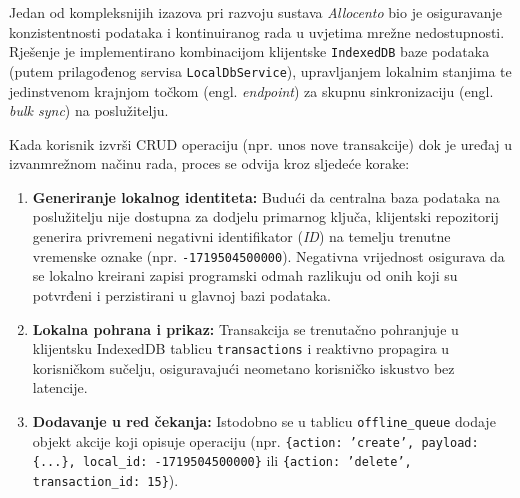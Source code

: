 \documentclass[a4paper,12pt,oneside]{article}
\begin{document}
	Jedan od kompleksnijih izazova pri razvoju sustava \textit{Allocento} bio je osiguravanje konzistentnosti podataka i kontinuiranog rada u uvjetima mrežne nedostupnosti. Rješenje je implementirano kombinacijom klijentske \texttt{IndexedDB} baze podataka (putem prilagođenog servisa \texttt{LocalDbService}), upravljanjem lokalnim stanjima te jedinstvenom krajnjom točkom (engl. \textit{endpoint}) za skupnu sinkronizaciju (engl. \textit{bulk sync}) na poslužitelju.
	
	Kada korisnik izvrši CRUD operaciju (npr. unos nove transakcije) dok je uređaj u izvanmrežnom načinu rada, proces se odvija kroz sljedeće korake:
	\begin{enumerate}
		\item \textbf{Generiranje lokalnog identiteta:} Budući da centralna baza podataka na poslužitelju nije dostupna za dodjelu primarnog ključa, klijentski repozitorij generira privremeni negativni identifikator (\textit{ID}) na temelju trenutne vremenske oznake (npr. \texttt{-1719504500000}). Negativna vrijednost osigurava da se lokalno kreirani zapisi programski odmah razlikuju od onih koji su potvrđeni i perzistirani u glavnoj bazi podataka.
		
		\item \textbf{Lokalna pohrana i prikaz:} Transakcija se trenutačno pohranjuje u klijentsku IndexedDB tablicu \texttt{transactions} i reaktivno propagira u korisničkom sučelju, osiguravajući neometano korisničko iskustvo bez latencije.
		
		\item \textbf{Dodavanje u red čekanja:} Istodobno se u tablicu \texttt{offline\_queue} dodaje objekt akcije koji opisuje operaciju (npr. \texttt{\{action: 'create', payload: \{...\}, local\_id: -1719504500000\}} ili \texttt{\{action: 'delete', transaction\_id: 15\}}).
	\end{enumerate}
	
\end{document}
